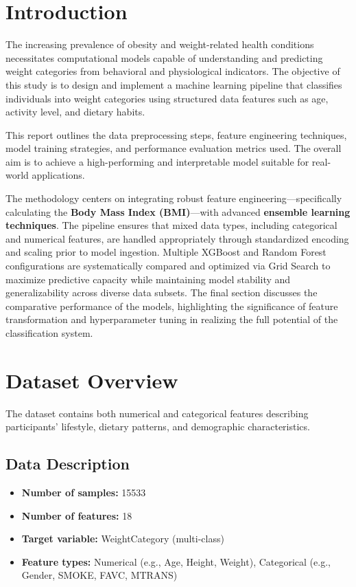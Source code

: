\documentclass[12pt,a4paper]{report}
\begin{document}
\chapter{Introduction}
The increasing prevalence of obesity and weight-related health conditions necessitates computational models capable of understanding and predicting weight categories from behavioral and physiological indicators. The objective of this study is to design and implement a machine learning pipeline that classifies individuals into weight categories using structured data features such as age, activity level, and dietary habits.

This report outlines the data preprocessing steps, feature engineering techniques, model training strategies, and performance evaluation metrics used. The overall aim is to achieve a high-performing and interpretable model suitable for real-world applications.

The methodology centers on integrating robust feature engineering—specifically calculating the \textbf{Body Mass Index (BMI)}—with advanced \textbf{ensemble learning techniques}. The pipeline ensures that mixed data types, including categorical and numerical features, are handled appropriately through standardized encoding and scaling prior to model ingestion. Multiple XGBoost and Random Forest configurations are systematically compared and optimized via Grid Search to maximize predictive capacity while maintaining model stability and generalizability across diverse data subsets. The final section discusses the comparative performance of the models, highlighting the significance of feature transformation and hyperparameter tuning in realizing the full potential of the classification system.

\chapter{Dataset Overview}
The dataset contains both numerical and categorical features describing participants' lifestyle, dietary patterns, and demographic characteristics.

\section{Data Description}
\begin{itemize}
    \item \textbf{Number of samples:} 15533
    \item \textbf{Number of features:} 18
    \item \textbf{Target variable:} WeightCategory (multi-class)
    \item \textbf{Feature types:} Numerical (e.g., Age, Height, Weight), Categorical (e.g., Gender, SMOKE, FAVC, MTRANS)
\end{itemize}
\end{document}

